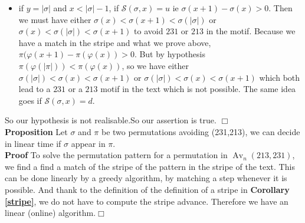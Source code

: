 \documentclass[a4paper]{llncs}
\DeclareMathOperator{\Avd}{Av}
\newcommand\Av[2]{\Avd_{{#1}}({#2})}
\newcommand{\ptext}{\pi}
\newcommand{\pmotif}{\sigma}
\newcounter{num}
\newcommand{\num}{\stepcounter{num} }
\newcommand{\dstep}{d}
\newcommand{\ustep}{u}
\begin{document}
\begin{itemize}
			\item if $y = |\pmotif|$ and $x<|\pmotif|-1$,
			if $\mathcal{S}(\pmotif,x)=\ustep$ ie
			$\pmotif(x+1)-\pmotif(x)>0$. Then
			we must have either
			$\pmotif(x)<\pmotif(x+1)<\pmotif(|\pmotif|)$
			or $\pmotif(x)<\pmotif(|\pmotif|)<\pmotif(x+1)$ 
			to avoid $231$ or $213$ in the motif.
			Because we have a match in the stripe
			and what we prove above,
			$\ptext(\varphi(x+1)-\ptext(\varphi(x))>0$.
			But by hypothesis $\ptext(\varphi(|\ptext|))<\ptext(\varphi(x))$,
			so we have either 		
			$\pmotif(|\pmotif|)<\pmotif(x)<\pmotif(x+1)$
			or $\pmotif(|\pmotif|)<\pmotif(x)<\pmotif(x+1)$ 
			which both lead to a $231$ or a $213$ motif
			in the text which is not possible.
			The same idea goes if $\mathcal{S}(\pmotif,x)=\dstep$. 			
			
		\end{itemize}
		So our hypothesis is not realisable.So our assertion is true. $\Box$\\
		
		\textbf{Proposition  \num \thenum} Let $\pmotif$ and $\ptext$
		be two permutations avoiding (231,213), 
		we can decide in linear time if $\pmotif$ 
		appear in $\ptext$.\\	
		
		\textbf{Proof}	
		To solve the permutation pattern for a permutation in $\Av{n}{213,231}$, 
		we find a find a match of the stripe of the pattern in the stripe of the text.
		This can be done linearly by a greedy algorithm, 
		by matching a step whenever it is possible.
		And thank to the definition of the definition of a stripe in \textbf{Corollary \ref{stripe}},
		we do not have to compute the stripe advance.
		Therefore we have an linear (online) algorithm.$\Box$\\
				

		
\end{document}
